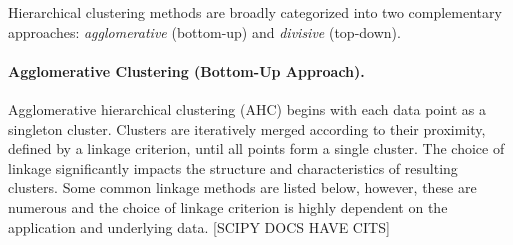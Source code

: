 Hierarchical clustering methods are broadly categorized into two
complementary approaches: \textit{agglomerative} (bottom-up) and
\textit{divisive} (top-down).

\paragraph{Agglomerative Clustering (Bottom-Up Approach).}
Agglomerative hierarchical clustering (AHC) begins with each data
point as a singleton cluster. Clusters are iteratively merged
according to their proximity, defined by a linkage criterion, until
all points form a single cluster. The choice of linkage significantly
impacts the structure and characteristics of resulting clusters.
Some common linkage methods are listed below, however, these are
numerous and the choice of linkage criterion is highly dependent on
the application and underlying data. [SCIPY DOCS HAVE CITS]

